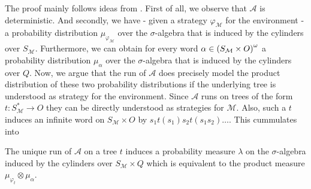 The proof mainly follows ideas from \cite[Proposition 43]{RandAutoInfTrees}.
First of all, we observe that $\mathcal{A}$ is deterministic. And secondly, we
have - given a strategy $\varphi_{\mathcal{M}}$ for the environment - a
probability distribution $\mu_{\varphi_{\mathcal{M}}}$ over the
$\sigma$-algebra that is induced by the cylinders over $S_{\mathcal{M}}$.
Furthermore, we can obtain for every word
$\alpha\in\left(S_{\mathcal{M}}\times O\right)^{\omega}$ a probability distribution
$\mu_{\alpha}$ over the $\sigma$-algebra that is induced by the cylinders over
$Q$. Now, we argue that the run of $\mathcal{A}$ does precisely model the
product distribution of these two probability distributions if the underlying
tree is understood as strategy for the environment. Since $\mathcal{A}$ runs on
trees of the form $t:S_{\mathcal{M}}^{*}\rightarrow O$ they can be directly
understood as strategies for $\mathcal{M}$. Also, such a $t$ induces an
infinite word on $S_{\mathcal{M}}\times O$ by
$s_{1}t(s_{1})s_{2}t(s_{1}s_{2})\dots$. This cummulates into
\begin{lemma}
  The unique run of $\mathcal{A}$ on a tree $t$ induces a probability measure
  $\lambda$ on the $\sigma$-algebra induced by the cylinders over
  $S_{\mathcal{M}}\times Q$ which is equivalent to the product measure
  $\mu_{\varphi_{t}}\otimes \mu_{\alpha}$.
  \label{lem:productmeasure}
\end{lemma}
